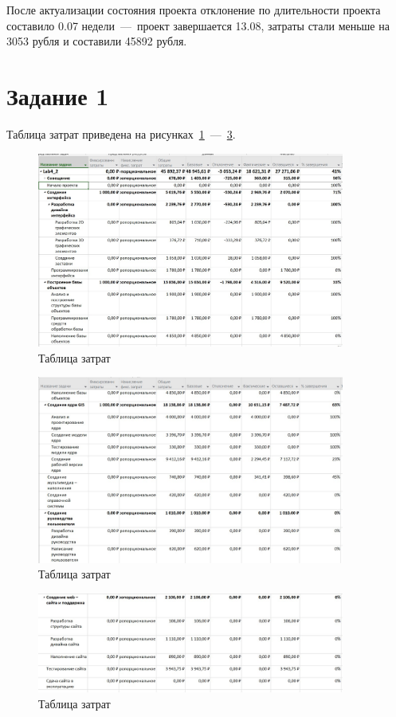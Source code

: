 После актуализации состояния проекта отклонение по длительности проекта составило 0.07 недели~---~проект завершается 13.08, затраты стали меньше на 3053 рубля и составили 45892 рубля.

\section{Задание 1}

Таблица затрат приведена на рисунках~\ref{fig:screen1}~---~\ref{fig:screen3}.

\begin{figure}[H]
	\centering
	\includegraphics[width=0.9\textwidth]{img/screen1_1.jpg}
	\caption{Таблица затрат}
	\label{fig:screen1}
\end{figure}

\begin{figure}[H]
	\centering
	\includegraphics[width=0.9\textwidth]{img/screen1_2.jpg}
	\caption{Таблица затрат}
	\label{fig:screen2}
\end{figure}

\begin{figure}[H]
	\centering
	\includegraphics[width=0.9\textwidth]{img/screen1_3.jpg}
	\caption{Таблица затрат}
	\label{fig:screen3}
\end{figure}

